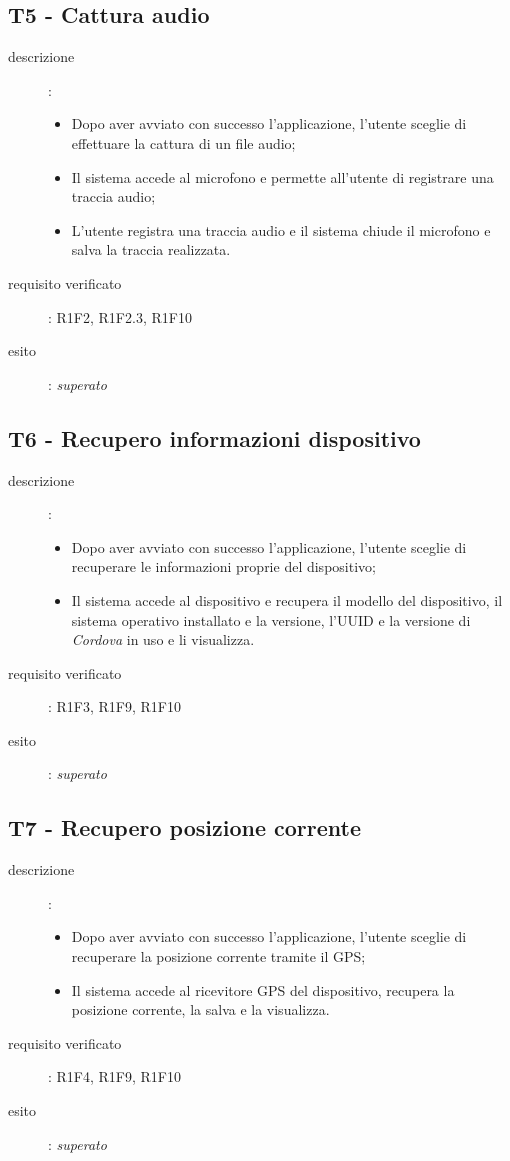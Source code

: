 \subsection{T5 - Cattura audio}
\begin{description}
\item[descrizione]: \hfill
	\begin{itemize}
	\item Dopo aver avviato con successo l'applicazione, l'utente sceglie di effettuare la cattura di un file audio;
	\item Il sistema accede al microfono e permette all'utente di registrare una traccia audio;
	\item L'utente registra una traccia audio e il sistema chiude il microfono e salva la traccia realizzata.
	\end{itemize}
\item[requisito verificato]: R1F2, R1F2.3, R1F10
\item[esito]: \emph{superato}
\end{description}

\subsection{T6 - Recupero informazioni dispositivo}
\begin{description}
\item[descrizione]: \hfill
	\begin{itemize}
	\item Dopo aver avviato con successo l'applicazione, l'utente sceglie di recuperare le informazioni proprie del dispositivo;
	\item Il sistema accede al dispositivo e recupera il modello del dispositivo, il sistema operativo installato e la versione, l'\ac{UUID} e la versione di \emph{Cordova} in uso e li visualizza.
	\end{itemize}
\item[requisito verificato]: R1F3, R1F9, R1F10
\item[esito]: \emph{superato}
\end{description}

\subsection{T7 - Recupero posizione corrente}
\begin{description}
\item[descrizione]: \hfill
	\begin{itemize}
	\item Dopo aver avviato con successo l'applicazione, l'utente sceglie di recuperare la posizione corrente tramite il \ac{GPS};
	\item Il sistema accede al ricevitore \ac{GPS} del dispositivo, recupera la posizione corrente, la salva e la visualizza.
	\end{itemize}
\item[requisito verificato]: R1F4, R1F9, R1F10
\item[esito]: \emph{superato}
\end{description}

